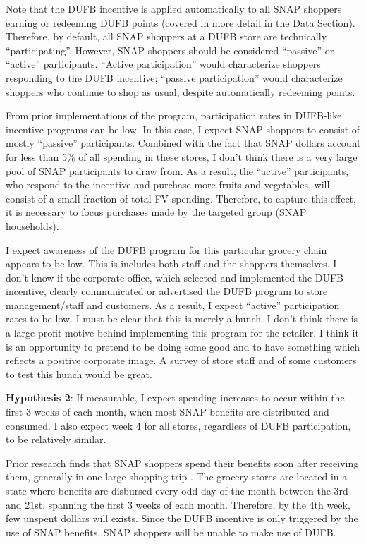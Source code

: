 \documentclass[12pt,letterpaperpaper,]{book}
\begin{document}
Note that the DUFB incentive is applied automatically to all SNAP
shoppers earning or redeeming DUFB points (covered in more detail in the
\protect\hyperlink{data-1}{Data Section}). Therefore, by default, all
SNAP shoppers at a DUFB store are technically ``participating''.
However, SNAP shoppers should be considered ``passive'' or ``active''
participants. ``Active participation'' would characterize shoppers
responding to the DUFB incentive; ``passive participation'' would
characterize shoppers who continue to shop as usual, despite
automatically redeeming points.

From prior implementations of the program, participation rates in
DUFB-like incentive programs can be low. In this case, I expect SNAP
shoppers to consist of mostly ``passive'' participants. Combined with
the fact that SNAP dollars account for less than 5\% of all spending in
these stores, I don't think there is a very large pool of SNAP
participants to draw from. As a result, the ``active'' participants, who
respond to the incentive and purchase more fruits and vegetables, will
consist of a small fraction of total FV spending. Therefore, to capture
this effect, it is necessary to focus purchases made by the targeted
group (SNAP households).

I expect awareness of the DUFB program for this particular grocery chain
appears to be low. This is includes both staff and the shoppers
themselves. I don't know if the corporate office, which selected and
implemented the DUFB incentive, clearly communicated or advertised the
DUFB program to store management/staff and customers. As a result, I
expect ``active'' participation rates to be low. I must be clear that
this is merely a hunch. I don't think there is a large profit motive
behind implementing this program for the retailer. I think it is an
opportunity to pretend to be doing some good and to have something which
reflects a positive corporate image. A survey of store staff and of some
customers to test this hunch would be great.

\textbf{Hypothesis 2}: If measurable, I expect spending increases to
occur within the first 3 weeks of each month, when most SNAP benefits
are distributed and consumed. I also expect week 4 for all stores,
regardless of DUFB participation, to be relatively similar.

Prior research finds that SNAP shoppers spend their benefits soon after
receiving them, generally in one large shopping trip
\citep{wiig_art_2009, damon_first_2013}. The grocery stores are located
in a state where benefits are disbursed every odd day of the month
between the 3rd and 21st, spanning the first 3 weeks of each month.
Therefore, by the 4th week, few unspent dollars will exists. Since the
DUFB incentive is only triggered by the use of SNAP benefits, SNAP
shoppers will be unable to make use of DUFB.
\end{document}
